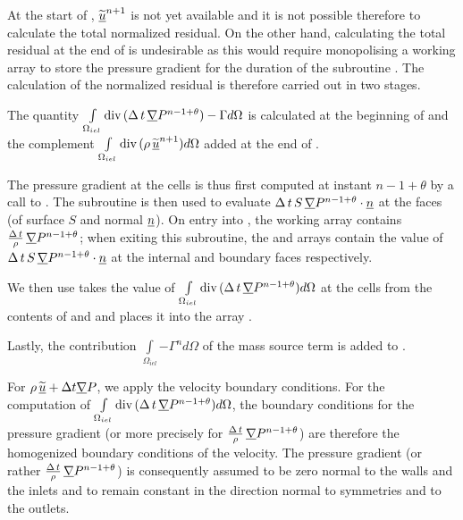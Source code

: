 At the start of , $\widetilde{\underline{u}}^{n+1}$ is not yet available and it is not possible therefore to calculate the total normalized residual. On the other hand, calculating the total residual at the end of  is undesirable as this would require monopolising a working array to store the pressure gradient for the duration of the subroutine .
The calculation of the normalized residual is therefore carried out in two stages.

The quantity $\int\limits_{\Omega_{iel}}{\text{div}\,(\Delta\,t\,\underline{\nabla}{P^{n-1+\theta}}) -\Gamma d\Omega}$ is calculated at the beginning of  and the complement $\int\limits_{\Omega_{iel}}{\text{div}\,(\rho\,\widetilde{\underline{u}}^{n+1})d\Omega}$ added at the end of .

The pressure gradient at the cells is thus first computed at instant $n-1+\theta$ by a call to . The subroutine  is then used to evaluate $\Delta\,t\,S\,\underline{\nabla}{P^{n-1+\theta}}\cdot\underline{n}$ at the faces (of surface $S$ and normal $\underline{n}$). On entry into , the working array  contains $\frac{\Delta\,t}{\rho}\,\underline{\nabla}{P^{n-1+\theta}}$; when exiting this subroutine, the  and  arrays contain the value of $\Delta\,t\,S\,\underline{\nabla}{P^{n-1+\theta}}\cdot\underline{n}$ at the internal and boundary faces respectively.

We then use  takes the value of $\int\limits_{\Omega_{iel}}{\text{div}\,(\Delta\,t\,\underline{\nabla}{P^{n-1+\theta}}) d\Omega}$ at the cells from the contents of  and  and places it into the array .

Lastly, the contribution $\int\limits_{\Omega_{iel}}{ -\Gamma^{n} d\Omega}$ of the mass source term is added to .

For $\rho\,\widetilde{\underline{u}} + \Delta t \underline{\nabla}{P}$, we apply the velocity boundary conditions. For the computation of
$\int\limits_{\Omega_{iel}}{\text{div}\,(\Delta\,t\,\underline{\nabla}{P^{n-1+\theta}}) d\Omega}$, the boundary conditions for the pressure gradient (or more precisely for $\frac{\Delta\,t}{\rho}\,\underline{\nabla}{P^{n-1+\theta}}$) are therefore the homogenized boundary conditions of the velocity. The pressure gradient (or rather $\frac{\Delta\,t}{\rho}\,\underline{\nabla}{P^{n-1+\theta}}$) is consequently assumed to be zero normal to the walls and the inlets and to remain constant in the direction normal to symmetries and to the outlets.

